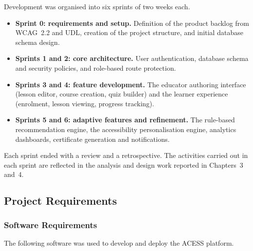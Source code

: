 \documentclass[12pt, oneside]{article} %
\begin{document}
Development was organised into six sprints of two weeks each.

\begin{itemize}
    \item \textbf{Sprint 0: requirements and setup.} Definition of the product backlog from WCAG~2.2 and UDL, creation of the project structure, and initial database schema design.
    \item \textbf{Sprints 1 and 2: core architecture.} User authentication, database schema and security policies, and role-based route protection.
    \item \textbf{Sprints 3 and 4: feature development.} The educator authoring interface (lesson editor, course creation, quiz builder) and the learner experience (enrolment, lesson viewing, progress tracking).
    \item \textbf{Sprints 5 and 6: adaptive features and refinement.} The rule-based recommendation engine, the accessibility personalisation engine, analytics dashboards, certificate generation and notifications.
\end{itemize}

Each sprint ended with a review and a retrospective. The activities carried out in each sprint are reflected in the analysis and design work reported in Chapters~3 and~4.

\subsection{Project Requirements}
\label{sec:proj-requirements}

\subsubsection{Software Requirements}

The following software was used to develop and deploy the ACESS platform.
\end{document}
